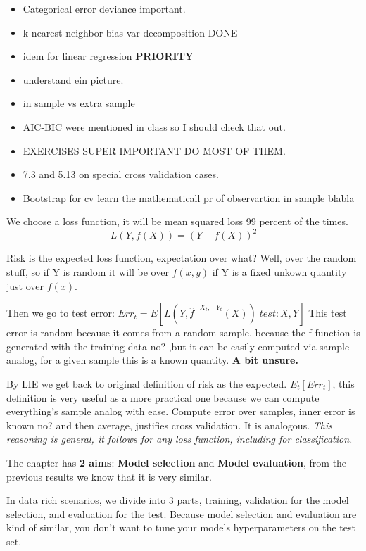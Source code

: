 \documentclass{article}
\begin{document}
\begin{itemize}
    \item Categorical error deviance important.
    \item k nearest neighbor bias var decomposition DONE
    \item idem for linear regression \textbf{PRIORITY}
    \item understand ein picture.
    \item in sample vs extra sample 
    \item AIC-BIC were mentioned in class so I should check that out. 
    \item EXERCISES SUPER IMPORTANT DO MOST OF THEM.
    \item 7.3 and 5.13 on special cross validation cases.
    \item Bootstrap for cv learn the mathematicall pr of observartion in sample blabla
\end{itemize}

We choose a loss function, it will be mean squared loss 99 percent of the times. $$L(Y,f(X))=(Y-f(X))^2$$ 

Risk is the expected loss function, expectation over what? Well, over the random stuff, so if Y is random it will be over $f(x,y)$ if Y is a fixed unkown quantity just over $f(x)$.

Then we go to test error: $Err_t= E[L(Y,\hat{f}^{-X_t,-Y_t}(X))|test: X,Y]$
This test error is random because it comes from a random sample, because the f function is generated with the training data no? ,but it can be easily computed via sample analog, for a given sample this is a known quantity. \textbf{A bit unsure.}

By LIE we get back to original definition of risk as the expected. $E_t[Err_t]$, this definition is very useful as a more practical one because we can compute everything's sample analog with ease. Compute error over samples, inner error is known no? and then average, justifies cross validation. It is analogous.
\textit{This reasoning is general, it follows for any loss function, including for classification.}

The chapter has \textbf{2 aims}: \textbf{Model selection} and \textbf{Model evaluation}, from the previous results we know that it is very similar.

In data rich scenarios, we divide into 3 parts, training, validation for the model selection, and evaluation for the test. Because model selection and evaluation are kind of similar, you don't want to tune your models hyperparameters on the test set.
\end{document}
